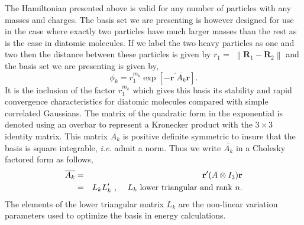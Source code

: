 \documentclass[12pt,doublespace]{article}
\begin{document}
The Hamiltonian presented above is valid for any number of particles with
any masses and charges. The basis set we are presenting is however designed
for use in the case where exactly two particles have much larger masses than
the rest as is the case in diatomic molecules. If we label the two heavy
particles as one and two then the distance between these particles is given
by $r_{1}=$ $\left\| \mathbf{R}_{1}-\mathbf{R}_{2}\right\| $ and the basis
set we are presenting is given by, 
\begin{equation}
\phi _{k}=r_{1}^{m_{k}}\exp \left[ -\mathbf{r}^{\prime }\overline{A_{k}}%
\mathbf{r}\right] .  \label{basis1}
\end{equation}
It is the inclusion of the factor $r_{1}^{m_{k}}$ which gives this basis its
stability and rapid convergence characteristics for diatomic molecules
compared with simple correlated Gaussians. The matrix of the quadratic form
in the exponential is denoted using an overbar to represent a Kronecker
product with the $3\times 3$ identity matrix. This matrix $\overline{A_{k}}$
is positive definite symmetric to insure that the basis is square
integrable, \textit{i.e.} admit a norm. Thus we write $\overline{A_{k}}$ in
a Cholesky factored form as follows,\qquad 
\begin{eqnarray}
\overline{A_{k}} &=&\mathbf{r}^{\prime }(A\otimes I_{3})\mathbf{r} \\
&=&L_{k}L_{k}^{\prime }\text{ ,\thinspace \thinspace \thinspace \thinspace
\thinspace \thinspace \thinspace \thinspace }L_{k}\text{ lower triangular
and rank }n.  \notag
\end{eqnarray}
The elements of the lower triangular matrix $L_{k}$ are the non-linear
variation parameters used to optimize the basis in energy calculations.
\end{document}
